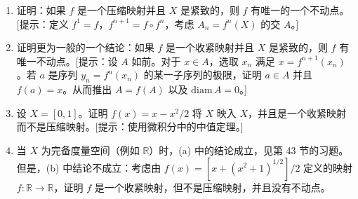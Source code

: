 \begin{enumerate}
\begin{enumerate}
\item 证明：如果 $f$ 是一个压缩映射并且 $X$ 是紧致的，则 $f$ 有唯一的一个不动点。[提示：定义 $f^{1}=f$，$f^{n+1}=f\circ f^{n}$，考虑 $A_{n}=f^{n}(X)$ 的交 $A$。]
\item 证明更为一般的一个结论：如果 $f$ 是一个收紧映射并且 $X$ 是紧致的，则 $f$ 有唯一不动点。[提示：设 $A$ 如前。对于 $x\in A$，选取 $x_{n}$ 满足 $x=f^{n+1}(x_{n})$。若 $a$ 是序列 $y_{n}=f^{n}(x_{n})$ 的某一子序列的极限，证明 $a\in A$ 并且 $f(a)=x$。从而推出 $A=f(A)$ 以及 $\mathrm{diam}\,A=0$。]
\item 设 $X=[0,1]$。证明 $f(x)=x-x^{2}/2$ 将 $X$ 映入 $X$，并且是一个收紧映射而不是压缩映射。[提示：使用微积分中的中值定理。]
\item 当 $X$ 为完备度量空间（例如 $\mathbb{R}$）时，(a) 中的结论成立，见第 43 节的习题。但是，(b) 中结论不成立：考虑由 $f(x)=[x+(x^{2}+1)^{1/2}]/2$ 定义的映射 $f\colon\mathbb{R}\to\mathbb{R}$，证明 $f$ 是一个收紧映射，但不是压缩映射，并且没有不动点。
\end{enumerate}
\end{enumerate}